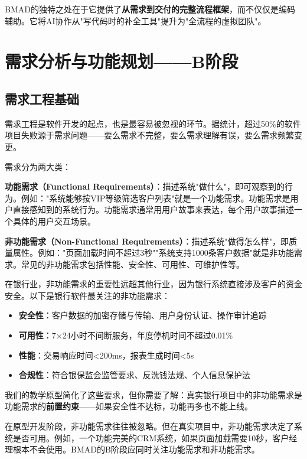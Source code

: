 BMAD的独特之处在于它提供了\textbf{从需求到交付的完整流程框架}，而不仅仅是编码辅助。它将AI协作从"写代码时的补全工具"提升为"全流程的虚拟团队"。

\section{需求分析与功能规划——B阶段}

\subsection{需求工程基础}

需求工程是软件开发的起点，也是最容易被忽视的环节。据统计，超过50\%的软件项目失败源于需求问题——要么需求不完整，要么需求理解有误，要么需求频繁变更。

需求分为两大类：

\textbf{功能需求（Functional Requirements）}：描述系统"做什么"，即可观察到的行为。例如："系统能够按VIP等级筛选客户列表"就是一个功能需求。功能需求是用户直接感知到的系统行为。功能需求通常用用户故事来表达，每个用户故事描述一个具体的用户交互场景。

\textbf{非功能需求（Non-Functional Requirements）}：描述系统"做得怎么样"，即质量属性。例如："页面加载时间不超过3秒""系统支持1000条客户数据"就是非功能需求。常见的非功能需求包括性能、安全性、可用性、可维护性等。

\begin{theorybox}[银行软件的非功能需求]
在银行业，非功能需求的重要性远超其他行业，因为银行系统直接涉及客户的资金安全。以下是银行软件最关注的非功能需求：
\begin{itemize}[leftmargin=2em]
  \item \textbf{安全性}：客户数据的加密存储与传输、用户身份认证、操作审计追踪
  \item \textbf{可用性}：7×24小时不间断服务，年度停机时间不超过0.01\%
  \item \textbf{性能}：交易响应时间<200ms，报表生成时间<5s
  \item \textbf{合规性}：符合银保监会监管要求、反洗钱法规、个人信息保护法
\end{itemize}
我们的教学原型简化了这些要求，但你需要了解：真实银行项目中的非功能需求是功能需求的\textbf{前置约束}——如果安全性不达标，功能再多也不能上线。\end{theorybox}

\begin{notebox}[非功能需求的重要性]
在原型开发阶段，非功能需求往往被忽略。但在真实项目中，非功能需求决定了系统是否可用。例如，一个功能完美的CRM系统，如果页面加载需要10秒，客户经理根本不会使用。BMAD的B阶段应同时关注功能需求和非功能需求。
\end{notebox}

